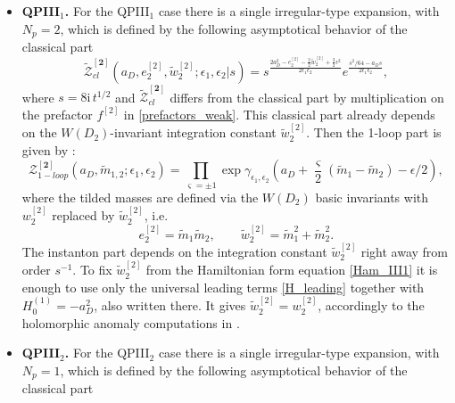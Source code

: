 \documentclass[12pt,a4paper]{article}
\numberwithin{equation}{section}
\newcommand{\ri}{\mathrm{i}}
\newcommand{\D}{\scriptscriptstyle{D}}
\begin{document}
\begin{itemize}
Finally, this derivation gives 
\begin{equation}
    \check{w}_4^{[3]}=w_4^{[3]}-\frac38w_2^{[3]}\epsilon^2+\frac{105}{1024}\epsilon^4,
     \end{equation}
which explicitly reproduces the holomorphic anomaly result \cite[(5.27)]{BST25}.
     
    \item {\bf QPIII$_1$.} For the QPIII$_1$ case there is a single irregular-type expansion, with $N_p=2$, which is defined by the following asymptotical behavior of the classical part
    \begin{equation}
\widetilde{\mathcal{Z}}^{[\mathbf{2}]}_{cl}(a_{\D},e_2^{[2]},\tilde{w}_2^{[2]};\epsilon_1,\epsilon_2|s)= s^{\frac{2a_{D}^2-e_2^{[2]}-\frac32\tilde{w}_2^{[2]}{+}\frac32\epsilon^2}{2\epsilon_1\epsilon_2}}e^{\frac{s^2/64-a_{\D} s}{2\epsilon_1\epsilon_2}},    
    \end{equation}
    where $s=8\ri\, t^{1/2}$ and $\widetilde{\mathcal{Z}}_{cl}^{[\mathbf{2}]}$ differs from the classical part \cite[(4.38)]{BST25} by multiplication on the prefactor $f^{[2]}$ in \eqref{prefactors_weak}. This classical part already depends on the $W(D_2)$-invariant integration constant $\tilde{w}_2^{[2]}$. Then the 1-loop part is given by \cite[(4.45)]{BST25}:
    \begin{equation}\label{Z1loop_2}
    \mathcal{Z}_{1-loop}^{[\mathbf{2}]}(a_{\D},\tilde{m}_{1,2};\epsilon_1,\epsilon_2)=\prod\limits_{\varsigma=\pm1}  \exp \gamma_{\epsilon_1,\epsilon_2} \left(a_{\D}{+}\frac{\varsigma}2(\tilde{m}_1{-}\tilde{m}_2)-\epsilon/2\right), 
\end{equation}
where the tilded masses are defined via the $W(D_2)$ basic invariants with $w_2^{[2]}$ replaced by $\tilde{w}^{[2]}_2$, i.e.
\begin{equation}
e_2^{[2]}=\tilde{m}_1\tilde{m}_2, \qquad \tilde{w}_2^{[2]}=\tilde{m}_1^2+\tilde{m}_2^2.
\end{equation}
The instanton part \cite[(4.41)]{BST25} depends on the integration constant $\tilde{w}_2^{[2]}$ right away from order $s^{-1}$.
To fix $\tilde{w}_2^{[2]}$ from the Hamiltonian form equation \eqref{Ham_III1} it is enough to use only the universal leading terms \eqref{H_leading} together with $H_0^{(1)}=-a_{\D}^2$, also written there. It gives $\tilde{w}_2^{[2]}=w_2^{[2]}$, accordingly to the holomorphic anomaly computations in \cite[Sec. 5.2]{BST25}.
    \item {\bf QPIII$_2$.}
    For the QPIII$_2$ case there is a single irregular-type expansion, with $N_p=1$, which is defined by the following asymptotical behavior of the classical part \cite[(4.53)]{BST25}

\end{itemize}
\end{document}
